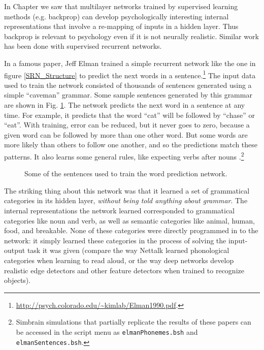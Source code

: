 In Chapter  we saw that multilayer networks trained by supervised learning methods (e.g. backprop) can develop psychologically interesting internal representations that involve a re-mapping of inputs in a hidden layer. Thus backprop is relevant to psychology even if it is not neurally realistic. Similar work has been done with supervised recurrent networks. 

In a famous paper, Jeff Elman trained a simple recurrent network like the one in figure \ref{SRN_Structure} to predict the next words in a sentence.\footnote{\url{http://psych.colorado.edu/~kimlab/Elman1990.pdf}.}  The input data used to train the network consisted of thousands of sentences generated using a simple ``caveman'' grammar. Some sample sentences generated by this grammar are shown in Fig. \ref{elman_sentences}. The network predicts the next word in  a sentence at any time. For example, it predicts that the word ``cat'' will be followed by ``chase'' or ``eat''. With training, error can be reduced, but it never goes to zero, because a given word can be followed by more than one other word. But some words are more likely than others to follow one another, and so the predictions match these patterns. It also learns some general rules, like expecting verbs after nouns \cite{elman1990finding}.\footnote{Simbrain simulations that partially replicate the results of these papers can be accessed in the script menu as \texttt{elmanPhonemes.bsh} and \texttt{elmanSentences.bsh}.}

\begin{figure}[h]
\centering
{}
\caption[Generated by Jeff Yoshimi based on \cite{elman1990finding}.]{Some of the sentences used to train the word prediction network.}
\label{elman_sentences}
\end{figure}

The striking thing about this network was that it learned a set of grammatical categories in its hidden layer, \emph{without being told anything about grammar}. The internal representations the network learned corresponded to grammatical categories like noun and verb, as well as semantic categories like animal, human, food, and breakable. None of these categories were directly programmed in to the network: it simply learned these categories in the process of solving the input-output task it was given (compare the way Nettalk learned phonological categories when learning to read aloud, or the way deep networks develop realistic edge detectors and other feature detectors when trained to recognize objects). 

